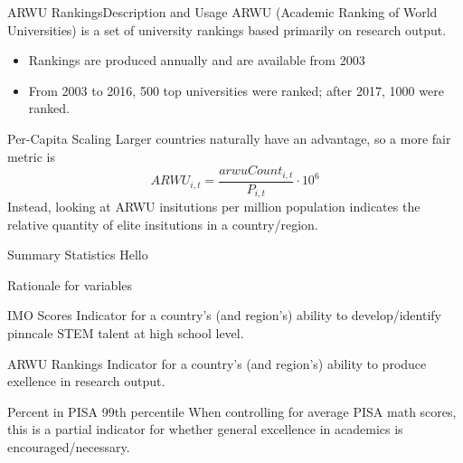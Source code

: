 \documentclass[10pt]{beamer}
\begin{document}
\begin{frame}{ARWU Rankings}{Description and Usage}
    ARWU (Academic Ranking of World Universities) is a set of university rankings based primarily on research output.
    \begin{itemize}
        \item Rankings are produced annually and are available from 2003
        \item From 2003 to 2016, 500 top universities were ranked; after 2017, 1000 were ranked.
    \end{itemize}
    
    \begin{block}{Per-Capita Scaling}
        Larger countries naturally have an advantage, so a more fair metric is
        \[ARWU_{i,t} = \frac{arwuCount_{i,t}}{P_{i,t}} \cdot 10^6 \]
        Instead, looking at ARWU insitutions per million population indicates the relative quantity of elite insitutions in a country/region.
    \end{block}
    
\end{frame}

\begin{frame}{Summary Statistics}
    Hello
\end{frame}

\begin{frame}{Rationale for variables}
    \begin{block}{IMO Scores}
        Indicator for a country's (and region's) ability to develop/identify pinncale STEM talent at high school level.
    \end{block}

    \begin{block}{ARWU Rankings}
        Indicator for a country's (and region's) ability to produce exellence in research output.
    \end{block}

    \begin{block}{Percent in PISA 99th percentile}
        When controlling for average PISA math scores, this is a partial indicator for whether general excellence in academics is encouraged/necessary.
    \end{block}
\end{frame}
\end{document}

